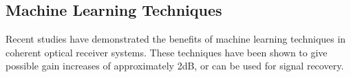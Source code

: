 \subsection{Machine Learning Techniques}

Recent studies have demonstrated the benefits of machine learning techniques in
coherent optical receiver systems\cite{kMeans_2019}\cite{nn_2020}. These
techniques have been shown to give possible gain increases of approximately
2dB\cite{kMeans_2019}, or can be used for signal recovery\cite{nn_2020}.
